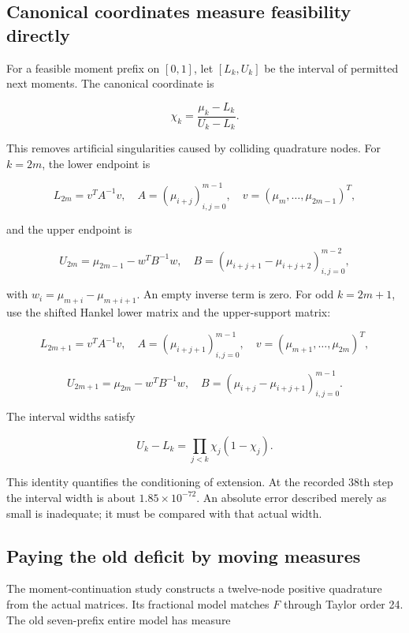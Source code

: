 \documentclass[
  10pt,
  a4paper,
  10pt,
  oneside,
  openany]{book}
\begin{document}
\subsection{Canonical coordinates measure feasibility
directly}\label{canonical-coordinates-measure-feasibility-directly}

For a feasible moment prefix on \([0,1]\), let \([L_k,U_k]\) be the
interval of permitted next moments. The canonical coordinate is

\[
\chi_k=\frac{\mu_k-L_k}{U_k-L_k}.
\tag{21.7}\label{eq:21.7}
\]

This removes artificial singularities caused by colliding quadrature
nodes. For \(k=2m\), the lower endpoint is

\[
L_{2m}=v^TA^{-1}v,
\quad A=(\mu_{i+j})_{i,j=0}^{m-1},
\quad v=(\mu_m,\ldots,\mu_{2m-1})^T,
\tag{21.8}\label{eq:21.8}
\]

and the upper endpoint is

\[
U_{2m}=\mu_{2m-1}-w^TB^{-1}w,
\quad B=(\mu_{i+j+1}-\mu_{i+j+2})_{i,j=0}^{m-2},
\tag{21.9}\label{eq:21.9}
\]

with \(w_i=\mu_{m+i}-\mu_{m+i+1}\). An empty inverse term is zero. For
odd \(k=2m+1\), use the shifted Hankel lower matrix and the
upper-support matrix:

\[
L_{2m+1}=v^TA^{-1}v,
\quad A=(\mu_{i+j+1})_{i,j=0}^{m-1},
\quad v=(\mu_{m+1},\ldots,\mu_{2m})^T,
\tag{21.10}\label{eq:21.10}
\]

\[
U_{2m+1}=\mu_{2m}-w^TB^{-1}w,
\quad B=(\mu_{i+j}-\mu_{i+j+1})_{i,j=0}^{m-1}.
\tag{21.11}\label{eq:21.11}
\]

The interval widths satisfy

\[
U_k-L_k=\prod_{j<k}\chi_j(1-\chi_j).
\tag{21.12}\label{eq:21.12}
\]

This identity quantifies the conditioning of extension. At the recorded
38th step the interval width is about \(1.85\times10^{-72}\). An
absolute error described merely as small is inadequate; it must be
compared with that actual width.

\subsection{Paying the old deficit by moving
measures}\label{paying-the-old-deficit-by-moving-measures}

The moment-continuation study constructs a twelve-node positive
quadrature from the actual matrices. Its fractional model matches \(F\)
through Taylor order 24. The old seven-prefix entire model has measure
\end{document}

